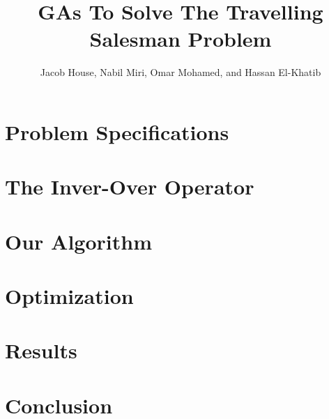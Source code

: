 \documentclass[12pt, twocolumn]{article}
\title{GAs To Solve The Travelling Salesman Problem}
\author{Jacob House, Nabil Miri, Omar Mohamed, and Hassan El-Khatib}
\begin{document}
	\maketitle
	\section{Problem Specifications}
	
	\section{The Inver-Over Operator}
	
	\section{Our Algorithm}
	
	\section{Optimization}
	
	\section{Results}
	
	\section{Conclusion}
	
	
	
\end{document}
